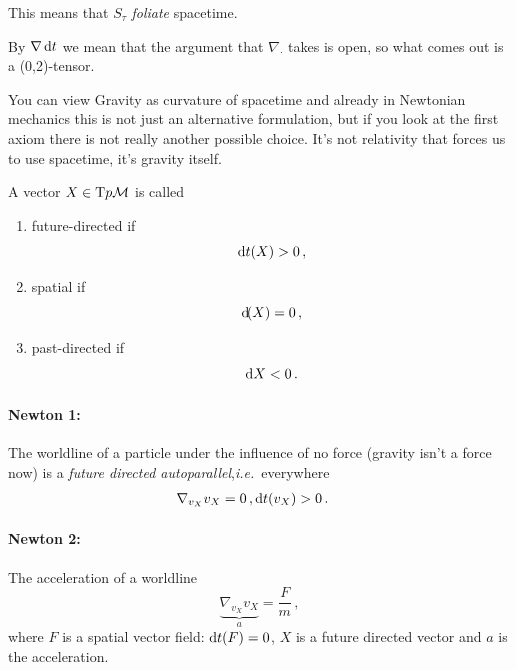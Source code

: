\documentclass[11pt, a4paper, twocolumn]{article} %
\begin{document}
This means that $S_\tau$ \textit{foliate} spacetime.
\begin{note}
    By $\nabla \operatorname{d\!} t$ we mean that the argument that $\nabla_\cdot$ takes is
    open, so what comes out is a (0,2)-tensor.
\end{note}
\begin{note}
    You can view Gravity as curvature of spacetime and already in Newtonian mechanics
    this is not just an alternative formulation,
    but if you look at the first axiom there is not really another possible choice.
    It's not relativity that forces us to use spacetime, it's gravity itself.
\end{note}
\begin{defn}[]
    A vector $X\in\T{p}\M$ is called
    \begin{enumerate}
        \item future-directed if
            \begin{equation}
                \operatorname{d\!} t(X) > 0\,,
            \end{equation}
        \item spatial if
            \begin{equation}
                \operatorname{d\!}(X) = 0\,,
            \end{equation}

        \item past-directed if
            \begin{equation}
                \operatorname{d\!}{X}<0\,.
            \end{equation}
    \end{enumerate}
\end{defn}
\paragraph{Newton 1:} The worldline of a particle under the influence
of no force (gravity isn't a force now) is a \textit{future directed
autoparallel},\textit{i.e.}\ everywhere
\begin{align}
    \nabla_{v_X}v_X &= 0\,,
    \operatorname{d\!} t(v_X)>0\,.
\end{align}
\paragraph{Newton 2:}
The acceleration of a worldline
\begin{equation}
    \underbrace{\nabla_{v_X}v_X}_a = \frac{F}{m}\,,
\end{equation}
where $F$ is a spatial vector field: $\operatorname{d\!} t(F) =0$, $X$ is a future directed vector
and $a$ is the acceleration.
\end{document}
